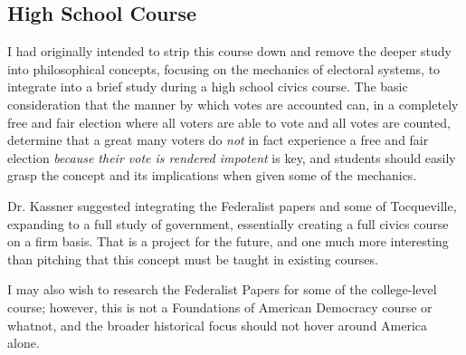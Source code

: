 
\subsection{High School Course}

I had originally intended to strip this course down and remove the deeper study into philosophical concepts, focusing on the mechanics of electoral systems, to integrate into a brief study during a high school civics course.  The basic consideration that the manner by which votes are accounted can, in a completely free and fair election where all voters are able to vote and all votes are counted, determine that a great many voters do \textit{not} in fact experience a free and fair election \textit{because their vote is rendered impotent} is key, and students should easily grasp the concept and its implications when given some of the mechanics.

Dr. Kassner suggested integrating the Federalist papers and some of Tocqueville, expanding to a full study of government, essentially creating a full civics course on a firm basis.  That is a project for the future, and one much more interesting than pitching that this concept must be taught in existing courses.

I may also wish to research the Federalist Papers for some of the college-level course; however, this is not a Foundations of American Democracy course or whatnot, and the broader historical focus should not hover around America alone.
